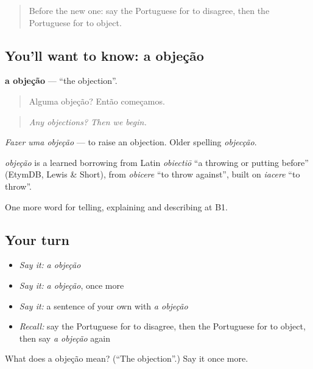 \begin{quote}
Before the new one: say the Portuguese for to disagree, then the Portuguese for to object.
\end{quote}

\subsection*{You'll want to know: a objeção}
\textbf{a objeção} — \textquotedblleft{}the objection\textquotedblright{}.

\begin{quote}
Alguma objeção? Então começamos.
\end{quote}

\begin{quote}
\emph{Any objections? Then we begin.}
\end{quote}

\emph{Fazer uma objeção} — to raise an objection. Older spelling \emph{objecção}.

\begin{cousinweb}
\emph{objeção} is a learned borrowing from Latin \emph{obiectiō} \textquotedblleft{}a throwing or putting before\textquotedblright{} (EtymDB, Lewis \& Short), from \emph{obicere} \textquotedblleft{}to throw against\textquotedblright{}, built on \emph{iacere} \textquotedblleft{}to throw\textquotedblright{}.
\end{cousinweb}

\begin{grammarlens}[title={What you've built}]
One more word for telling, explaining and describing at B1.
\end{grammarlens}

\subsection*{Your turn}
\begin{itemize}
\raggedright
  \item \emph{Say it:} \emph{a objeção}
  \item \emph{Say it:} \emph{a objeção}, once more
  \item \emph{Say it:} a sentence of your own with \emph{a objeção}
  \item \emph{Recall:} say the Portuguese for to disagree, then the Portuguese for to object, then say \emph{a objeção} again
\end{itemize}

\begin{tcolorbox}[breakable,colback=teal!4,colframe=teal!35!black,title={Before you move on}]
What does a objeção mean? (\textquotedblleft{}The objection\textquotedblright{}.) Say it once more.
\end{tcolorbox}
